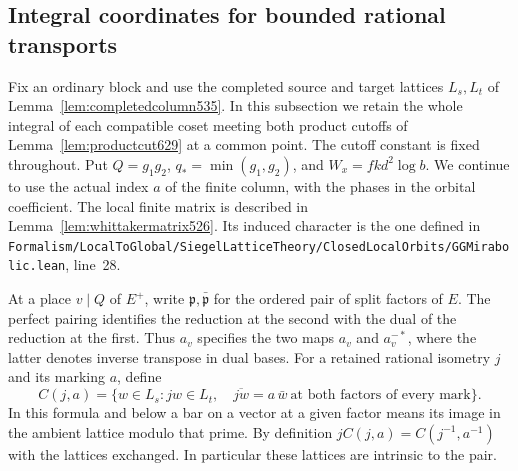 \documentclass[a4paper,11pt]{article}
\theoremstyle{definition}
\theoremstyle{remark}
\newcommand{\srcloc}[2]{{\small\nolinkurl{#1.lean}}, line~#2}
\numberwithin{equation}{section}
\begin{document}
\subsection{Integral coordinates for bounded rational transports}
\label{sec:boundedcoordinates631}

Fix an ordinary block and use the completed source and target lattices
\(L_s,L_t\) of Lemma~\ref{lem:completedcolumn535}. In this subsection
we retain the whole integral of each compatible coset meeting both
product cutoffs of Lemma~\ref{lem:productcut629} at a common point.
The cutoff constant is fixed throughout. Put \(Q=g_1g_2\),
\(q_*=\min(g_1,g_2)\), and \(W_x=fk d^2\log b\).
We continue to use the actual index \(a\) of the finite column,
with the phases in the orbital coefficient. The local finite
matrix is described in Lemma~\ref{lem:whittakermatrix526}.
Its induced character is the one defined in
\srcloc{Formalism/LocalToGlobal/SiegelLatticeTheory/ClosedLocalOrbits/GGMirabolic}{28}.

At a place \(v\mid Q\) of \(E^+\), write \(\mathfrak p,\bar{\mathfrak p}\)
for the ordered pair of split factors of \(E\). The perfect pairing
identifies the reduction at the second with the dual of the reduction
at the first. Thus \(a_v\) specifies the two maps \(a_v\) and
\(a_v^{-*}\), where the latter denotes inverse transpose in dual bases.
For a retained rational isometry \(j\) and its marking \(a\), define
\[
 C(j,a)=\{w\in L_s:jw\in L_t,\quad
       \overline{jw}=a\,\bar w\ \text{at both factors of every mark}\}.
\]
In this formula and below a bar on a vector at a given factor means
its image in the ambient lattice modulo that prime. By definition
\(jC(j,a)=C(j^{-1},a^{-1})\) with the lattices exchanged.
In particular these lattices are intrinsic to the pair.
\end{document}
